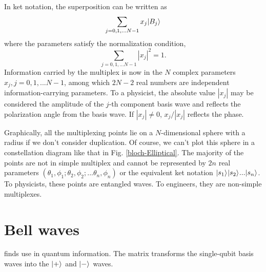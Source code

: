 \documentclass[oneside, letter, 12pt]{book}
\begin{document}
In ket notation, the superposition can be written as
\begin{equation}
    \sum_{j = 0, 1, ... N-1} x_j \vert {B_j} \rangle_{}
\end{equation}
where the parameters satisfy the normalization condition,
\begin{equation}
    \sum_{j = 0, 1, ... N-1} |x_j|^2 =1.
\end{equation}
Information carried by the multiplex is now in the $N$ complex parameters ${x_j, j=0, 1, ... N-1}$, among which $2N-2$ real numbers are independent information-carrying parameters. To a physicist, the absolute value $|x_j|$ may be considered the amplitude of the $j$-th component basis wave and reflects the polarization angle from the basis wave. If $|x_j| \neq 0$, $x_j / |x_j|$ reflects the phase.

Graphically, all the multiplexing points lie on a $N$-dimensional sphere with a radius if we don't consider duplication. Of course, we can't plot this sphere in a constellation diagram like that in Fig. \ref{bloch-Elliptical}. The majority of the points are not in simple multiplex and cannot be represented by $2n$ real parameters $(\theta_1, \phi_1; \theta_2, \phi_2; ... \theta_n, \phi_n)$ or the equivalent ket notation $\vert {s_1} \rangle_{} \vert {s_2} \rangle_{} ... \vert {s_n} \rangle_{}$. To physicists, these points are entangled waves. To engineers, they are non-simple multiplexes.

\section{Bell waves}

finds use in quantum information. The matrix transforms the single-qubit basis waves into the $\vert {+} \rangle_{}$ and $\vert {-} \rangle_{}$ waves.
\end{document}
